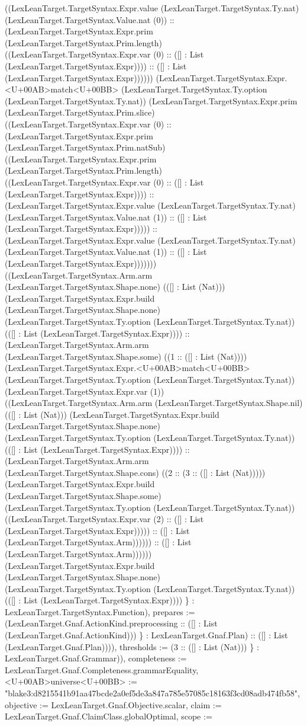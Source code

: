 \documentclass[11pt]{article}
\begin{document}
((LexLeanTarget.TargetSyntax.Expr.value (LexLeanTarget.TargetSyntax.Ty.nat) (LexLeanTarget.TargetSyntax.Value.nat (0)) :: (LexLeanTarget.TargetSyntax.Expr.prim (LexLeanTarget.TargetSyntax.Prim.length) ((LexLeanTarget.TargetSyntax.Expr.var (0) :: ([] : List (LexLeanTarget.TargetSyntax.Expr)))) :: ([] : List (LexLeanTarget.TargetSyntax.Expr)))))) (LexLeanTarget.TargetSyntax.Expr.<U+00AB>match<U+00BB> (LexLeanTarget.TargetSyntax.Ty.option (LexLeanTarget.TargetSyntax.Ty.nat)) (LexLeanTarget.TargetSyntax.Expr.prim (LexLeanTarget.TargetSyntax.Prim.slice) ((LexLeanTarget.TargetSyntax.Expr.var (0) :: (LexLeanTarget.TargetSyntax.Expr.prim (LexLeanTarget.TargetSyntax.Prim.natSub) ((LexLeanTarget.TargetSyntax.Expr.prim (LexLeanTarget.TargetSyntax.Prim.length) ((LexLeanTarget.TargetSyntax.Expr.var (0) :: ([] : List (LexLeanTarget.TargetSyntax.Expr)))) :: (LexLeanTarget.TargetSyntax.Expr.value (LexLeanTarget.TargetSyntax.Ty.nat) (LexLeanTarget.TargetSyntax.Value.nat (1)) :: ([] : List (LexLeanTarget.TargetSyntax.Expr))))) :: (LexLeanTarget.TargetSyntax.Expr.value (LexLeanTarget.TargetSyntax.Ty.nat) (LexLeanTarget.TargetSyntax.Value.nat (1)) :: ([] : List (LexLeanTarget.TargetSyntax.Expr))))))) ((LexLeanTarget.TargetSyntax.Arm.arm (LexLeanTarget.TargetSyntax.Shape.none) (([] : List (Nat))) (LexLeanTarget.TargetSyntax.Expr.build (LexLeanTarget.TargetSyntax.Shape.none) (LexLeanTarget.TargetSyntax.Ty.option (LexLeanTarget.TargetSyntax.Ty.nat)) (([] : List (LexLeanTarget.TargetSyntax.Expr)))) :: (LexLeanTarget.TargetSyntax.Arm.arm (LexLeanTarget.TargetSyntax.Shape.some) ((1 :: ([] : List (Nat)))) (LexLeanTarget.TargetSyntax.Expr.<U+00AB>match<U+00BB> (LexLeanTarget.TargetSyntax.Ty.option (LexLeanTarget.TargetSyntax.Ty.nat)) (LexLeanTarget.TargetSyntax.Expr.var (1)) ((LexLeanTarget.TargetSyntax.Arm.arm (LexLeanTarget.TargetSyntax.Shape.nil) (([] : List (Nat))) (LexLeanTarget.TargetSyntax.Expr.build (LexLeanTarget.TargetSyntax.Shape.none) (LexLeanTarget.TargetSyntax.Ty.option (LexLeanTarget.TargetSyntax.Ty.nat)) (([] : List (LexLeanTarget.TargetSyntax.Expr)))) :: (LexLeanTarget.TargetSyntax.Arm.arm (LexLeanTarget.TargetSyntax.Shape.cons) ((2 :: (3 :: ([] : List (Nat))))) (LexLeanTarget.TargetSyntax.Expr.build (LexLeanTarget.TargetSyntax.Shape.some) (LexLeanTarget.TargetSyntax.Ty.option (LexLeanTarget.TargetSyntax.Ty.nat)) ((LexLeanTarget.TargetSyntax.Expr.var (2) :: ([] : List (LexLeanTarget.TargetSyntax.Expr))))) :: ([] : List (LexLeanTarget.TargetSyntax.Arm)))))) :: ([] : List (LexLeanTarget.TargetSyntax.Arm)))))) (LexLeanTarget.TargetSyntax.Expr.build (LexLeanTarget.TargetSyntax.Shape.none) (LexLeanTarget.TargetSyntax.Ty.option (LexLeanTarget.TargetSyntax.Ty.nat)) (([] : List (LexLeanTarget.TargetSyntax.Expr)))) \} : LexLeanTarget.TargetSyntax.Function), prepares := (LexLeanTarget.Gnaf.ActionKind.preprocessing :: ([] : List (LexLeanTarget.Gnaf.ActionKind))) \} : LexLeanTarget.Gnaf.Plan) :: ([] : List (LexLeanTarget.Gnaf.Plan)))), thresholds := (3 :: ([] : List (Nat))) \} : LexLeanTarget.Gnaf.Grammar)), completeness := LexLeanTarget.Gnaf.Completeness.grammarEquality, <U+00AB>universe<U+00BB> := "blake3:d8215541b91aa47bcde2a0ef5de3a847a785e57085c18163f3cd08adb474fb58", objective := LexLeanTarget.Gnaf.Objective.scalar, claim := LexLeanTarget.Gnaf.ClaimClass.globalOptimal, scope := 
\end{document}
